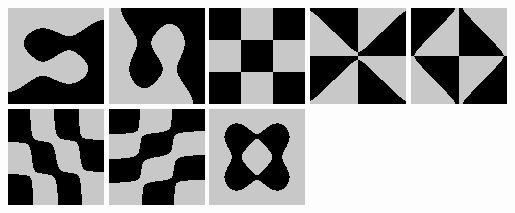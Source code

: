 \includegraphics{o/dchladni_009.png}
\includegraphics{o/dchladni_010.png}
\includegraphics{o/dchladni_011.png}
\includegraphics{o/dchladni_012.png}
\includegraphics{o/dchladni_013.png}
\includegraphics{o/dchladni_014.png}
\includegraphics{o/dchladni_015.png}
\includegraphics{o/dchladni_016.png}

